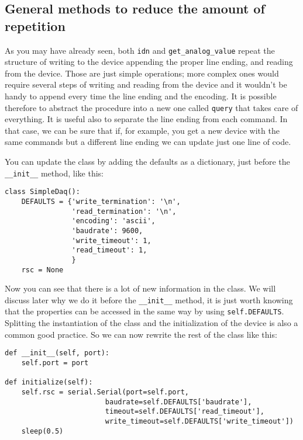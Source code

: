 \subsection{General methods to reduce the amount
of repetition}\label{general-methods-to-reduce-the-amount-ofrepetition}

As you may have already seen, both \texttt{idn} and
\texttt{get\_analog\_value} repeat the structure of writing to the
device appending the proper line ending, and reading from the device.
Those are just simple operations; more complex ones would require
several steps of writing and reading from the device and it wouldn't be
handy to append every time the line ending and the encoding. It is
possible therefore to abstract the procedure into a new one called
\texttt{query} that takes care of everything. It is useful also to
separate the line ending from each command. In that case, we can be sure
that if, for example, you get a new device with the same commands but a
different line ending we can update just one line of code.

You can update the class by adding the defaults as a dictionary, just
before the \texttt{\_\_init\_\_} method, like this:

\begin{verbatim}
class SimpleDaq():
    DEFAULTS = {'write_termination': '\n',
                'read_termination': '\n',
                'encoding': 'ascii',
                'baudrate': 9600,
                'write_timeout': 1,
                'read_timeout': 1,
                }
    rsc = None
\end{verbatim}

Now you can see that there is a lot of new information in the class. We
will discuss later why we do it before the \texttt{\_\_init\_\_} method,
it is just worth knowing that the properties can be accessed in the same
way by using \texttt{self.DEFAULTS}. Splitting the instantiation of the
class and the initialization of the device is also a common good
practice. So we can now rewrite the rest of the class like this:

\begin{verbatim}
def __init__(self, port):
    self.port = port

def initialize(self):
    self.rsc = serial.Serial(port=self.port,
                        baudrate=self.DEFAULTS['baudrate'],
                        timeout=self.DEFAULTS['read_timeout'],
                        write_timeout=self.DEFAULTS['write_timeout'])
    sleep(0.5)
\end{verbatim}

